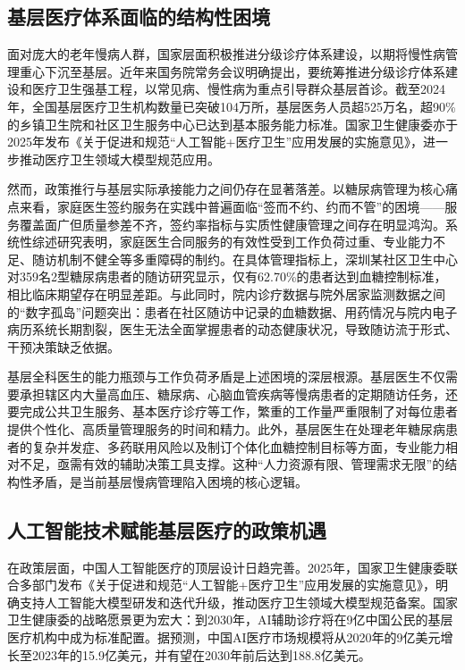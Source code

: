 \subsection{基层医疗体系面临的结构性困境}

面对庞大的老年慢病人群，国家层面积极推进分级诊疗体系建设，以期将慢性病管理重心下沉至基层。近年来国务院常务会议明确提出，要统筹推进分级诊疗体系建设和医疗卫生强基工程，以常见病、慢性病为重点引导群众基层首诊。截至2024年，全国基层医疗卫生机构数量已突破104万所，基层医务人员超525万名，超90\%的乡镇卫生院和社区卫生服务中心已达到基本服务能力标准。国家卫生健康委亦于2025年发布《关于促进和规范``人工智能+医疗卫生''应用发展的实施意见》，进一步推动医疗卫生领域大模型规范应用\todocite{}\todocite{}。

然而，政策推行与基层实际承接能力之间仍存在显著落差。以糖尿病管理为核心痛点来看，家庭医生签约服务在实践中普遍面临``签而不约、约而不管''的困境------服务覆盖面广但质量参差不齐，签约率指标与实质性健康管理之间存在明显鸿沟。系统性综述研究表明，家庭医生合同服务的有效性受到工作负荷过重、专业能力不足、随访机制不健全等多重障碍的制约。在具体管理指标上，深圳某社区卫生中心对359名2型糖尿病患者的随访研究显示，仅有62.70\%的患者达到血糖控制标准，相比临床期望存在明显差距。与此同时，院内诊疗数据与院外居家监测数据之间的``数字孤岛''问题突出：患者在社区随访中记录的血糖数据、用药情况与院内电子病历系统长期割裂，医生无法全面掌握患者的动态健康状况，导致随访流于形式、干预决策缺乏依据\todocite{}\todocite{}\todocite{}。

基层全科医生的能力瓶颈与工作负荷矛盾是上述困境的深层根源。基层医生不仅需要承担辖区内大量高血压、糖尿病、心脑血管疾病等慢病患者的定期随访任务，还要完成公共卫生服务、基本医疗诊疗等工作，繁重的工作量严重限制了对每位患者提供个性化、高质量管理服务的时间和精力。此外，基层医生在处理老年糖尿病患者的复杂并发症、多药联用风险以及制订个体化血糖控制目标等方面，专业能力相对不足，亟需有效的辅助决策工具支撑。这种``人力资源有限、管理需求无限''的结构性矛盾，是当前基层慢病管理陷入困境的核心逻辑\todocite{}。

\subsection{人工智能技术赋能基层医疗的政策机遇}

在政策层面，中国人工智能医疗的顶层设计日趋完善。2025年，国家卫生健康委联合多部门发布《关于促进和规范``人工智能+医疗卫生''应用发展的实施意见》，明确支持人工智能大模型研发和迭代升级，推动医疗卫生领域大模型规范备案。国家卫生健康委的战略愿景更为宏大：到2030年，AI辅助诊疗将在9亿中国公民的基层医疗机构中成为标准配置。据预测，中国AI医疗市场规模将从2020年的9亿美元增长至2023年的15.9亿美元，并有望在2030年前后达到188.8亿美元\todocite{}\todocite{}\todocite{}。

